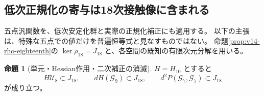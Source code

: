 \documentclass[a4paper,11pt]{ltjsarticle}
\theoremstyle{definition}
\newtheorem{proposition}[theorem]{命題}
\begin{document}
\subsection{低次正規化の寄与は18次接触像に含まれる}
\label{subsec:v14-lower-normalizers-vanish}

五点汎関数を、低次安定化群と実際の正規化補正にも適用する。
以下の主張は、特殊な五点での値だけを普遍恒等式と見なすものではない。
命題\ref{prop:v14-rho-eighteenth}の $\ker\rho_{18}=J_{18}$ と、各空間の既知の有限次元分解を用いる。

\begin{proposition}[単元・Hessian作用・二次補正の消滅]
\label{prop:v14-all-lower-corrections-in-image}
$H=H_{10}$ とすると
\[
 H\mathcal U_8\subset J_{18},\qquad
 dH(\mathcal G_9)\subset J_{18},\qquad
 d^2P(\mathcal G_7,\mathcal G_7)\subset J_{18}
\]
が成り立つ。
\end{proposition}
\end{document}
